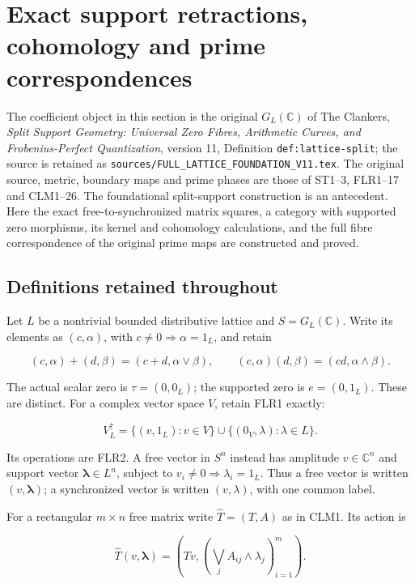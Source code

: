 \documentclass[11pt]{article}
\begin{document}
\section{Exact support retractions, cohomology and prime correspondences}
\label{sec:support-retraction-cohomology}

The coefficient object in this section is the original
$G_L(\mathbb C)$ of The Clankers,
\emph{Split Support Geometry: Universal Zero Fibres, Arithmetic Curves,
and Frobenius-Perfect Quantization}, version 11, Definition
\texttt{def:lattice-split}; the source is retained as
\texttt{sources/FULL\_LATTICE\_FOUNDATION\_V11.tex}.
The original source, metric, boundary maps and prime phases are
those of ST1--3, FLR1--17 and CLM1--26.
The foundational split-support construction is an antecedent.
Here the exact free-to-synchronized matrix squares, a category with
supported zero morphisms, its kernel and cohomology calculations,
and the full fibre correspondence of the original prime maps are
constructed and proved.

\subsection{Definitions retained throughout}

Let \(L\) be a nontrivial bounded distributive lattice and \(S=G_L(\mathbb C)\). Write its elements as \((c,\alpha)\), with \(c\ne0\Rightarrow\alpha=1_L\), and retain

\[
(c,\alpha)+(d,\beta)=(c+d,\alpha\vee\beta),\qquad
(c,\alpha)(d,\beta)=(cd,\alpha\wedge\beta).
\tag{CR1}
\]

The actual scalar zero is \(\tau=(0,0_L)\); the supported zero is \(e=(0,1_L)\). These are distinct. For a complex vector space \(V\), retain FLR1 exactly:

\[
V^\uparrow_L=\{(v,1_L):v\in V\}\cup\{(0_V,\lambda):\lambda\in L\}.
\tag{CR2}
\]

Its operations are FLR2. A free vector in \(S^n\) instead has amplitude \(v\in\mathbb C^n\) and support vector \(\boldsymbol\lambda\in L^n\), subject to \(v_i\ne0\Rightarrow\lambda_i=1_L\). Thus a free vector is written \((v,\boldsymbol\lambda)\); a synchronized vector is written \((v,\lambda)\), with one common label.

For a rectangular \(m\times n\) free matrix write \(\widehat T=(T,A)\) as in CLM1. Its action is

\[
\widehat T(v,\boldsymbol\lambda)=
\left(Tv,\left(\bigvee_j A_{ij}\wedge\lambda_j\right)_{i=1}^m\right).
\tag{CR3}
\]
\end{document}

